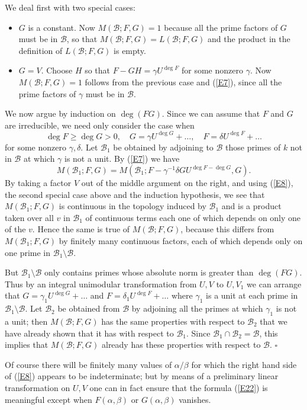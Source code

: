 \documentclass[12pt]{article}
\def\ga{{\alpha}}
\def\gb{{\beta}}
\def\gg{{\gamma}}
\def\gd{{\delta}}
\def\sB{{\mathcal B}}
\def\qed{{\hfill$\square$}}
\def\beq{\begin{equation} \label}
\begin{document}
We deal first with two special cases:
\begin{itemize}
\item $G$ is a constant. Now
$M(\sB;F,G)=1$ because all the prime factors of $G$ must be
in $\sB$, so that $M(\sB;F,G)=L(\sB;F,G)$ and
the product in the definition of $L(\sB;F,G)$ is empty.
\item $G=V$. Choose $H$ so that $F-GH=\gg U^{\deg F}$ for some
nonzero $\gg$. Now
$M(\sB;F,G)=1$ follows from the previous case and (\ref{E7}),
since all the prime factors of $\gg$ must be in $\sB$.
\end{itemize}
We now argue by induction on $\deg(FG)$.
Since we can assume that $F$ and $G$ are irreducible, we need only consider 
the case when
\[ \deg F\geq\deg G>0, \quad G=\gg U^{\deg G}+\ldots, \quad
F=\gd U^{\deg F}+\ldots \]
for some nonzero $\gg,\gd$. Let $\sB_1$ be obtained by adjoining to $\sB$
those primes of $k$ not in $\sB$ at which $\gg$
is not a unit. By (\ref{E7}) we have
\beq{E46} M(\sB_1;F,G)=M(\sB_1;F-\gg^{-1}\gd GU^{\deg F-\deg G},G).
\end{equation}
By taking a factor $V$ out of the middle argument on the right, and using
(\ref{E8}), the second special case above
and the induction hypothesis, we see that $M(\sB_1;F,G)$ is
continuous in the topology induced by $\sB_1$ and is a product taken over all
$v$ in $\sB_1$ of continuous terms each one of which depends on only one of
the $v$. Hence the same is true of
$M(\sB;F,G)$, because this differs from $M(\sB_1;F,G)$ by finitely many
continuous factors, each of which depends only on one prime in $\sB_1
\setminus\sB$.

But $\sB_1\setminus\sB$ only contains primes whose absolute norm is greater
than $\deg(FG)$. Thus by an integral unimodular transformation from $U,V$ to
$U,V_1$ we can arrange that $G=\gg_1U^{\deg G}+\ldots$ and $F=\gd_1U^{\deg F}
+\ldots$ where $\gg_1$ is a unit
at each prime in $\sB_1\setminus\sB$. Let $\sB_2$ be obtained from
$\sB$ by adjoining all the primes at which $\gg_1$
is not a unit; then $M(\sB;F,G)$ has the same properties with respect to
$\sB_2$ that we have already shown that it has with respect to $\sB_1$. Since
$\sB_1\cap\sB_2=\sB$, this implies that $M(\sB;F,G)$ already has these
properties with respect to $\sB$.  \qed

Of course there will be finitely many values of $\ga/\gb$ for which the right
hand side of (\ref{E8}) appears to be indeterminate; but by means of a
preliminary linear transformation on $U,V$ one can in fact ensure that the
formula (\ref{E22}) is meaningful except when $F(\ga,\gb)$ or
$G(\ga,\gb)$ vanishes.
\end{document}
